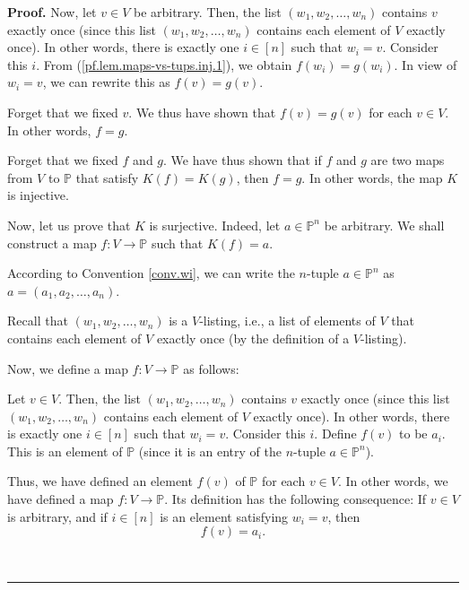 \documentclass[numbers=enddot,12pt,final,onecolumn,notitlepage]{scrartcl}%
\numberwithin{exer}{section}
\theoremstyle{definition}
\newenvironment{proof}[1][Proof]{\noindent\textbf{#1.} }{\ \rule{0.5em}{0.5em}}
\newenvironment{verlong}{}{}
\begin{document}
\begin{verlong}
\begin{proof}
Now, let $v\in V$ be arbitrary. Then, the list $\left(  w_{1},w_{2}%
,\ldots,w_{n}\right)  $ contains $v$ exactly once (since this list $\left(
w_{1},w_{2},\ldots,w_{n}\right)  $ contains each element of $V$ exactly once).
In other words, there is exactly one $i\in\left[  n\right]  $ such that
$w_{i}=v$. Consider this $i$. From (\ref{pf.lem.maps-vs-tups.inj.1}), we
obtain $f\left(  w_{i}\right)  =g\left(  w_{i}\right)  $. In view of $w_{i}%
=v$, we can rewrite this as $f\left(  v\right)  =g\left(  v\right)  $.

Forget that we fixed $v$. We thus have shown that $f\left(  v\right)
=g\left(  v\right)  $ for each $v\in V$. In other words, $f=g$.

Forget that we fixed $f$ and $g$. We have thus shown that if $f$ and $g$ are
two maps from $V$ to $\mathbb{P}$ that satisfy $K\left(  f\right)  =K\left(
g\right)  $, then $f=g$. In other words, the map $K$ is injective.

Now, let us prove that $K$ is surjective. Indeed, let $a\in\mathbb{P}^{n}$ be
arbitrary. We shall construct a map $f:V\rightarrow\mathbb{P}$ such that
$K\left(  f\right)  =a$.

According to Convention \ref{conv.wi}, we can write the $n$-tuple
$a\in\mathbb{P}^{n}$ as $a=\left(  a_{1},a_{2},\ldots,a_{n}\right)  $.

Recall that $\left(  w_{1},w_{2},\ldots,w_{n}\right)  $ is a $V$-listing,
i.e., a list of elements of $V$ that contains each element of $V$ exactly once
(by the definition of a $V$-listing).

Now, we define a map $f:V\rightarrow\mathbb{P}$ as follows:

Let $v\in V$. Then, the list $\left(  w_{1},w_{2},\ldots,w_{n}\right)  $
contains $v$ exactly once (since this list $\left(  w_{1},w_{2},\ldots
,w_{n}\right)  $ contains each element of $V$ exactly once). In other words,
there is exactly one $i\in\left[  n\right]  $ such that $w_{i}=v$. Consider
this $i$. Define $f\left(  v\right)  $ to be $a_{i}$. This is an element of
$\mathbb{P}$ (since it is an entry of the $n$-tuple $a\in\mathbb{P}^{n}$).

Thus, we have defined an element $f\left(  v\right)  $ of $\mathbb{P}$ for
each $v\in V$. In other words, we have defined a map $f:V\rightarrow
\mathbb{P}$. Its definition has the following consequence: If $v\in V$ is
arbitrary, and if $i\in\left[  n\right]  $ is an element satisfying $w_{i}=v$,
then%
\begin{equation}
f\left(  v\right)  =a_{i}. \label{pf.lem.maps-vs-tups.surj.3}%
\end{equation}



\end{proof}
\end{verlong}
\end{document}

